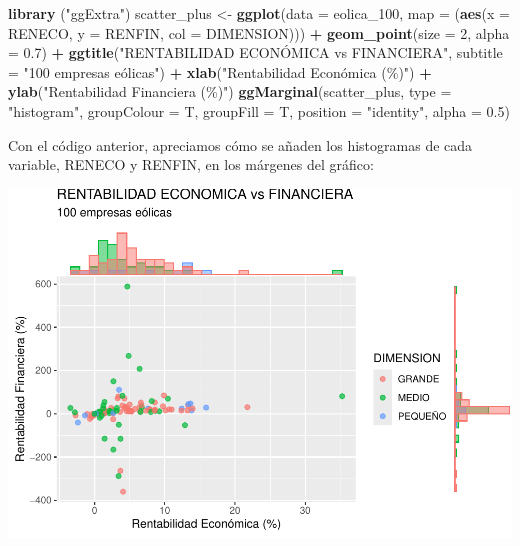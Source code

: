\documentclass[
]{book}
\newenvironment{Shaded}{\begin{snugshade}}{\end{snugshade}}
\newcommand{\AttributeTok}[1]{\textcolor[rgb]{0.13,0.29,0.53}{#1}}
\newcommand{\DecValTok}[1]{\textcolor[rgb]{0.00,0.00,0.81}{#1}}
\newcommand{\FloatTok}[1]{\textcolor[rgb]{0.00,0.00,0.81}{#1}}
\newcommand{\FunctionTok}[1]{\textcolor[rgb]{0.13,0.29,0.53}{\textbf{#1}}}
\newcommand{\NormalTok}[1]{#1}
\newcommand{\OtherTok}[1]{\textcolor[rgb]{0.56,0.35,0.01}{#1}}
\newcommand{\SpecialCharTok}[1]{\textcolor[rgb]{0.81,0.36,0.00}{\textbf{#1}}}
\newcommand{\StringTok}[1]{\textcolor[rgb]{0.31,0.60,0.02}{#1}}
\let\Oldincludegraphics\includegraphics
\renewcommand{\includegraphics}[2][]{%
  \Oldincludegraphics[#1]{#2}%
}
\begin{document}
\begin{Shaded}
\begin{Highlighting}[]
\FunctionTok{library}\NormalTok{ (}\StringTok{"ggExtra"}\NormalTok{)}
\NormalTok{scatter\_plus }\OtherTok{\textless{}{-}} \FunctionTok{ggplot}\NormalTok{(}\AttributeTok{data =}\NormalTok{ eolica\_100, }\AttributeTok{map =}\NormalTok{ (}\FunctionTok{aes}\NormalTok{(}\AttributeTok{x =}\NormalTok{ RENECO,}
                                                     \AttributeTok{y =}\NormalTok{ RENFIN,}
                                                     \AttributeTok{col =}\NormalTok{ DIMENSION))) }\SpecialCharTok{+}
  \FunctionTok{geom\_point}\NormalTok{(}\AttributeTok{size =} \DecValTok{2}\NormalTok{, }\AttributeTok{alpha =} \FloatTok{0.7}\NormalTok{) }\SpecialCharTok{+}
  \FunctionTok{ggtitle}\NormalTok{(}\StringTok{"RENTABILIDAD ECONÓMICA vs FINANCIERA"}\NormalTok{,}
          \AttributeTok{subtitle =} \StringTok{"100 empresas eólicas"}\NormalTok{) }\SpecialCharTok{+}
  \FunctionTok{xlab}\NormalTok{(}\StringTok{"Rentabilidad Económica (\%)"}\NormalTok{) }\SpecialCharTok{+}
  \FunctionTok{ylab}\NormalTok{(}\StringTok{"Rentabilidad Financiera (\%)"}\NormalTok{)}
\FunctionTok{ggMarginal}\NormalTok{(scatter\_plus, }\AttributeTok{type =} \StringTok{"histogram"}\NormalTok{, }\AttributeTok{groupColour =}\NormalTok{ T,}
           \AttributeTok{groupFill =}\NormalTok{ T, }\AttributeTok{position =} \StringTok{"identity"}\NormalTok{, }\AttributeTok{alpha =} \FloatTok{0.5}\NormalTok{)}
\end{Highlighting}
\end{Shaded}

Con el código anterior, apreciamos cómo se añaden los histogramas de cada variable, RENECO y RENFIN, en los márgenes del gráfico:

\includegraphics{_main_files/figure-latex/unnamed-chunk-121-1.pdf}
\end{document}
